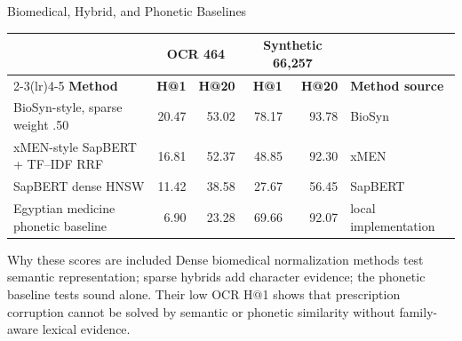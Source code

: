 \documentclass[aspectratio=169,10pt]{beamer}
\begin{document}
\begin{frame}{Biomedical, Hybrid, and Phonetic Baselines}
\scriptsize
\begin{tabular}{@{}lrrrrl@{}}
\toprule
& \multicolumn{2}{c}{\textbf{OCR 464}} & \multicolumn{2}{c}{\textbf{Synthetic 66,257}} & \\
\cmidrule(lr){2-3}\cmidrule(lr){4-5}
\textbf{Method} & \textbf{H@1} & \textbf{H@20} & \textbf{H@1} & \textbf{H@20} & \textbf{Method source} \\
\midrule
BioSyn-style, sparse weight .50 & 20.47 & 53.02 & 78.17 & 93.78 & BioSyn \\
xMEN-style SapBERT + TF--IDF RRF & 16.81 & 52.37 & 48.85 & 92.30 & xMEN \\
SapBERT dense HNSW & 11.42 & 38.58 & 27.67 & 56.45 & SapBERT \\
Egyptian medicine phonetic baseline & 6.90 & 23.28 & 69.66 & 92.07 & local implementation \\
\bottomrule
\end{tabular}

\vspace{3mm}
\begin{block}{Why these scores are included}
Dense biomedical normalization methods test semantic representation; sparse
hybrids add character evidence; the phonetic baseline tests sound alone. Their
low OCR H@1 shows that prescription corruption cannot be solved by semantic or
phonetic similarity without family-aware lexical evidence.
\end{block}
\end{frame}
\end{document}
